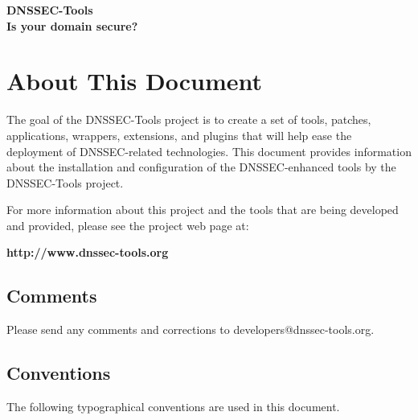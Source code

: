 \documentclass[12pt]{article}
\newcommand{\url}[1]{{\bf #1}}
\begin{document}
\clearpage

\begin{center}
{\Large
{\bf DNSSEC-Tools\\
Is your domain secure?}}
\end{center}
\tableofcontents
{}


\clearpage

\section{About This Document}
\label{about}

The goal of the DNSSEC-Tools project is to create a set of tools, patches,
applications, wrappers, extensions, and plugins that will help ease the
deployment of DNSSEC-related technologies. This document provides information
about the installation and configuration of the DNSSEC-enhanced tools by the
DNSSEC-Tools project.

For more information about this project and the tools that are being developed
and provided, please see the project web page at:

\url{http://www.dnssec-tools.org}

\subsection{Comments}

Please send any comments and corrections to developers@dnssec-tools.org.

\vspace{1in}

\subsection{Conventions}

The following typographical conventions are used in this document.
\end{document}
